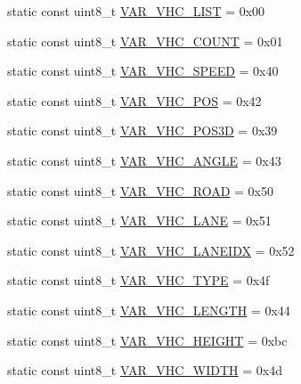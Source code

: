 \begin{DoxyCompactItemize}
\item 
static const uint8\+\_\+t \hyperlink{classtraci__api_1_1_vehicle_manager_a3a3e88819303878e178eaf8b8bdbcef4}{V\+A\+R\+\_\+\+V\+H\+C\+\_\+\+L\+I\+ST} = 0x00
\item 
static const uint8\+\_\+t \hyperlink{classtraci__api_1_1_vehicle_manager_a2b2f33767a7e8ed8d9d64f6ee3ad4ae2}{V\+A\+R\+\_\+\+V\+H\+C\+\_\+\+C\+O\+U\+NT} = 0x01
\item 
static const uint8\+\_\+t \hyperlink{classtraci__api_1_1_vehicle_manager_a77976695ff8714a9122a3e940cc54e04}{V\+A\+R\+\_\+\+V\+H\+C\+\_\+\+S\+P\+E\+ED} = 0x40
\item 
static const uint8\+\_\+t \hyperlink{classtraci__api_1_1_vehicle_manager_a1788cd990fdaa86ccb0fe19fc7cce48d}{V\+A\+R\+\_\+\+V\+H\+C\+\_\+\+P\+OS} = 0x42
\item 
static const uint8\+\_\+t \hyperlink{classtraci__api_1_1_vehicle_manager_a545dfa38d9a38ece41697cfd4bf9d061}{V\+A\+R\+\_\+\+V\+H\+C\+\_\+\+P\+O\+S3D} = 0x39
\item 
static const uint8\+\_\+t \hyperlink{classtraci__api_1_1_vehicle_manager_a04d9e30519527b2dc7cd46b8ef1a3cb0}{V\+A\+R\+\_\+\+V\+H\+C\+\_\+\+A\+N\+G\+LE} = 0x43
\item 
static const uint8\+\_\+t \hyperlink{classtraci__api_1_1_vehicle_manager_a3dfae245f71178616fa4cbd355de8950}{V\+A\+R\+\_\+\+V\+H\+C\+\_\+\+R\+O\+AD} = 0x50
\item 
static const uint8\+\_\+t \hyperlink{classtraci__api_1_1_vehicle_manager_a77a3774d3a7434fc480201f70973e9e4}{V\+A\+R\+\_\+\+V\+H\+C\+\_\+\+L\+A\+NE} = 0x51
\item 
static const uint8\+\_\+t \hyperlink{classtraci__api_1_1_vehicle_manager_aabbd35962ffe19b69a014feb37bde0c4}{V\+A\+R\+\_\+\+V\+H\+C\+\_\+\+L\+A\+N\+E\+I\+DX} = 0x52
\item 
static const uint8\+\_\+t \hyperlink{classtraci__api_1_1_vehicle_manager_a9b212d9d477bebf7f2fe54f9c3555acb}{V\+A\+R\+\_\+\+V\+H\+C\+\_\+\+T\+Y\+PE} = 0x4f
\item 
static const uint8\+\_\+t \hyperlink{classtraci__api_1_1_vehicle_manager_a60eabc78c2a9d2f68e46fcbaf0dbb8b6}{V\+A\+R\+\_\+\+V\+H\+C\+\_\+\+L\+E\+N\+G\+TH} = 0x44
\item 
static const uint8\+\_\+t \hyperlink{classtraci__api_1_1_vehicle_manager_af4d5d1a208087f6d8fcf587d48d2bc3e}{V\+A\+R\+\_\+\+V\+H\+C\+\_\+\+H\+E\+I\+G\+HT} = 0xbc
\item 
static const uint8\+\_\+t \hyperlink{classtraci__api_1_1_vehicle_manager_a8cb7a25163b002f45f977097a48b3173}{V\+A\+R\+\_\+\+V\+H\+C\+\_\+\+W\+I\+D\+TH} = 0x4d

\end{DoxyCompactItemize}
